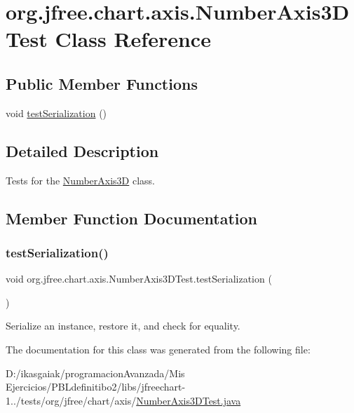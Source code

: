 \hypertarget{classorg_1_1jfree_1_1chart_1_1axis_1_1_number_axis3_d_test}{}\section{org.\+jfree.\+chart.\+axis.\+Number\+Axis3\+D\+Test Class Reference}
\label{classorg_1_1jfree_1_1chart_1_1axis_1_1_number_axis3_d_test}
\subsection*{Public Member Functions}
\begin{DoxyCompactItemize}
\item 
void \mbox{\hyperlink{classorg_1_1jfree_1_1chart_1_1axis_1_1_number_axis3_d_test_a6262fcce78773c8a4484154878ca0f0f}{test\+Serialization}} ()
\end{DoxyCompactItemize}


\subsection{Detailed Description}
Tests for the \mbox{\hyperlink{classorg_1_1jfree_1_1chart_1_1axis_1_1_number_axis3_d}{Number\+Axis3D}} class. 

\subsection{Member Function Documentation}
\mbox{\label{classorg_1_1jfree_1_1chart_1_1axis_1_1_number_axis3_d_test_a6262fcce78773c8a4484154878ca0f0f}} 
\subsubsection{\texorpdfstring{test\+Serialization()}{testSerialization()}}
{\footnotesize\ttfamily void org.\+jfree.\+chart.\+axis.\+Number\+Axis3\+D\+Test.\+test\+Serialization (\begin{DoxyParamCaption}{ }\end{DoxyParamCaption})}

Serialize an instance, restore it, and check for equality. 

The documentation for this class was generated from the following file\+:\begin{DoxyCompactItemize}
\item 
D\+:/ikasgaiak/programacion\+Avanzada/\+Mis Ejercicios/\+P\+B\+Ldefinitibo2/libs/jfreechart-\/1../tests/org/jfree/chart/axis/\mbox{\hyperlink{_number_axis3_d_test_8java}{Number\+Axis3\+D\+Test.\+java}}\end{DoxyCompactItemize}
